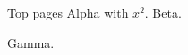 \documentclass{beamer}
\begin{document}
\begin{frame}[t,allowframebreaks]{Top pages}
Alpha with $x^2$.\newpage
Beta.\par\framebreak
Gamma.
\end{frame}
\end{document}
